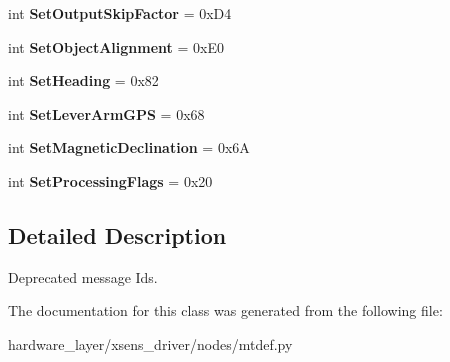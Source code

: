 \begin{DoxyCompactItemize}
\mbox{\label{classmtdef_1_1DeprecatedMID_adbb3a554f4260576de132ce994b21419}} 
int {\bfseries Set\+Output\+Skip\+Factor} = 0x\+D4
\item 
\mbox{\label{classmtdef_1_1DeprecatedMID_a5fd10d7480a4d49bef56fc0fc067513f}} 
int {\bfseries Set\+Object\+Alignment} = 0x\+E0
\item 
\mbox{\label{classmtdef_1_1DeprecatedMID_acea87b4dc1c35036d051716c8aa6b20f}} 
int {\bfseries Set\+Heading} = 0x82
\item 
\mbox{\label{classmtdef_1_1DeprecatedMID_a64be0cab8c31a851b7d25f9a07352159}} 
int {\bfseries Set\+Lever\+Arm\+G\+PS} = 0x68
\item 
\mbox{\label{classmtdef_1_1DeprecatedMID_a6a5cedb0e51e2ea8673e3cf310ec7f7b}} 
int {\bfseries Set\+Magnetic\+Declination} = 0x6A
\item 
\mbox{\label{classmtdef_1_1DeprecatedMID_a98ba01a9bd9f16cc4941b1157696c72b}} 
int {\bfseries Set\+Processing\+Flags} = 0x20
\end{DoxyCompactItemize}


\subsection{Detailed Description}
\begin{DoxyVerb}Deprecated message Ids.\end{DoxyVerb}
 

The documentation for this class was generated from the following file\+:\begin{DoxyCompactItemize}
\item 
hardware\+\_\+layer/xsens\+\_\+driver/nodes/mtdef.\+py\end{DoxyCompactItemize}
